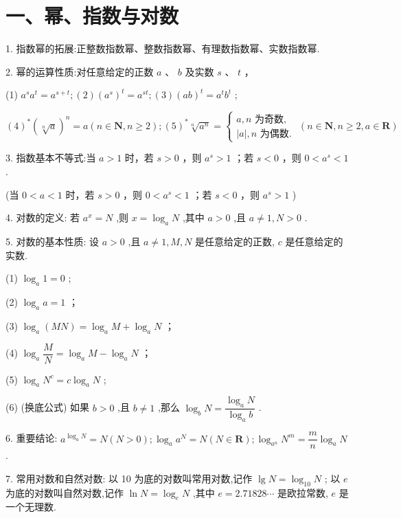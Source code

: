 \section*{一、幂、指数与对数}

1. 指数幂的拓展:正整数指数幂、整数指数幂、有理数指数幂、实数指数幂.

2. 幂的运算性质:对任意给定的正数 $a$ 、 $b$ 及实数 $s$ 、 $t$ ，

(1) ${a}^{s}{a}^{t} = {a}^{s + t};\left( 2\right) {\left( {a}^{s}\right) }^{t} = {a}^{st};\left( 3\right) {\left( ab\right) }^{t} = {a}^{t}{b}^{t}$ ;

${\left( 4\right) }^{ * }{\left( \sqrt[n]{a}\right) }^{n} = a\left( {n \in  \mathbf{N},n \geq  2}\right) ;{\left( 5\right) }^{ * }\sqrt[n]{{a}^{n}} = \left\{  {\begin{array}{l} a,n\text{ 为奇数, } \\  \left| a\right| ,n\text{ 为偶数. } \end{array}\left( {n \in  \mathbf{N},n \geq  2,a \in  \mathbf{R}}\right) }\right.$

3. 指数基本不等式:当 $a > 1$ 时，若 $s > 0$ ，则 ${a}^{s} > 1$ ；若 $s < 0$ ，则 $0 < {a}^{s} < 1$ .

(当 $0 < a < 1$ 时，若 $s > 0$ ，则 $0 < {a}^{s} < 1$ ；若 $s < 0$ ，则 ${a}^{s} > 1$ )

4. 对数的定义: 若 ${a}^{x} = N$ ,则 $x = {\log }_{a}N$ ,其中 $a > 0$ ,且 $a \neq  1,N > 0$ .

5. 对数的基本性质: 设 $a > 0$ ,且 $a \neq  1,M,N$ 是任意给定的正数, $c$ 是任意给定的实数.

(1) ${\log }_{a}1 = 0$ ;

(2) ${\log }_{a}a = 1$ ；

(3) ${\log }_{a}\left( {MN}\right)  = {\log }_{a}M + {\log }_{a}N$ ；

(4) ${\log }_{a}\dfrac{M}{N} = {\log }_{a}M - {\log }_{a}N$ ；

(5) ${\log }_{a}{N}^{c} = c{\log }_{a}N$ ;

(6) (换底公式) 如果 $b > 0$ ,且 $b \neq  1$ ,那么 ${\log }_{b}N = \dfrac{{\log }_{a}N}{{\log }_{a}b}$ .

6. 重要结论: ${a}^{{\log }_{a}N} = N\left( {N > 0}\right) ;{\log }_{a}{a}^{N} = N\left( {N \in  \mathbf{R}}\right) ;{\log }_{{a}^{n}}{N}^{m} = \dfrac{m}{n}{\log }_{a}N$ .

7. 常用对数和自然对数: 以 10 为底的对数叫常用对数,记作 $\lg N = {\log }_{10}N$ ; 以 ${e}$ 为底的对数叫自然对数,记作 $\ln N = {\log }_{{e}}N$ ,其中 ${e} = {2.71828}\cdots$ 是欧拉常数, ${e}$ 是一个无理数.

